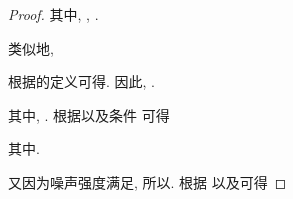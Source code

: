 \begin{proof}
\begin{comment}
        \end{comment}
        其中, , .
        \begin{comment}
        \nonumber-e^\top(t)[D(u)\otimes Q\Gamma]\delta(t)&\leq\frac{\mu}{2}e^\top(t)[D(u)D(u)^\top\otimes Q^2\Gamma^2]e(t)+\frac{1}{2\mu}\delta^\top(t)\delta(t)\\
        &\leq\frac{\mu}{2}\bar{q}^2\bar{\gamma}^2 e^\top(t)e(t)+\frac{1}{2\mu}\delta^\top(t)\delta(t).
        \end{comment}
        类似地,
        \begin{comment}
        \nonumber-e^\top(t)[D(u)\otimes Q\Gamma]\hat{s}(t)&\leq\frac{\mu}{2}e^\top(t)[D(u)D(u)^\top\otimes Q^2\Gamma^2]e(t)+\frac{1}{2\mu}\delta^\top(t)\hat{s}(t)\\
        &\leq\frac{\mu}{2}\bar{q}^2\bar{\gamma}^2e^\top(t)e(t)+\frac{1}{2\mu}\hat{s}^\top(t)\hat{s}(t).
        \end{comment}
        根据的定义可得. 因此, .
        \begin{comment}\label{tr}
        \nonumber\text{tr}[(I_N\otimes Q)\Sigma(t)\Sigma^\top(t)]&\leq\text{tr}[I_N\otimes Q]\text{tr}[\Sigma(t)\Sigma^\top(t)]\\
        \nonumber&\leq Nq\sum_{i=1}^N\text{tr}[R_i(t)R_i^\top(t)]\\
        &=Nqh(t),
        \end{comment}
        其中, .
        根据以及条件 可得
        \begin{comment}\label{quv}
        \nonumber e^\top(t)\sum_{v=1}^{m}q_{uv}\pi_v[I_N\otimes Q]e(t)&=e^\top(t)\Big[\sum_{v=1}^{m}q_{uv}(\pi_v-a_u)(I_N\otimes Q)\Big]e(t)\\
        \nonumber&=e^\top(t)\Big\{\Big[\sum_{v\in S_1^u}q_{uv}(\pi_v-a_u)+\sum_{v\in S_2^u}q_{uv}(\pi_v-a_u)\Big](I_N\otimes Q)\Big\}e(t)\\
        &\leq 2\chi_u\pi_ue^\top(t)[I_N\otimes Q]e(t),
        \end{comment}
        其中.

        又因为噪声强度满足, 所以.
        根据 以及可得
        \begin{comment}\label{ELVt}
        \nonumber E\mathcal{L}V(t)\leq&-\pi_u\xi e^\top(t)[I_u\otimes Q]e(t)+\pi_ue^\top(t)[((\bar{\delta}+\chi_u)I_N-c\underline{\gamma}(L(u)+\epsilon D(u)))\otimes Q]e(t)\\
        \nonumber&+\frac{1}{2}(\bar{\lambda}^2+2\epsilon)\pi_uc\bar{q}^2\bar{\gamma}^2\mu e^\top(t)e(t)
        +(1+\epsilon)\pi_uc\frac{1}{2\mu}\delta^\top(t)\delta(t)\\
        &+\pi_u\epsilon c\frac{1}{2\mu}\hat{s}^\top(t)\hat{s}(t)+\frac{1}{2}\pi_uc^2Nqh(t).
        \end{comment}


\end{proof}

